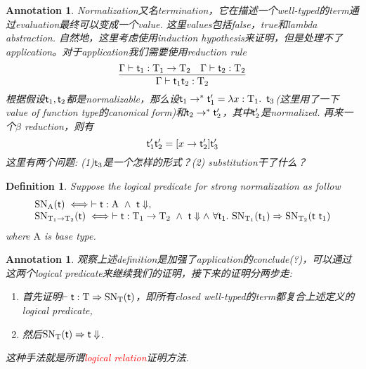 \documentclass{article}
\theoremstyle{plain}
\newtheorem{definition}[theorem]{Definition}
\newtheorem{annotation}[theorem]{Annotation}
\theoremstyle{nonumberplain}
\newcommand{\lam}[2]{\ensuremath{\lambda #1\ldotp~ #2}} %
\newcommand{\singletype}[1]{\text{#1}}
\newcommand{\termtype}[2]{\ensuremath{#1:#2}}
\newcommand{\term}[1]{\ensuremath\mathsf{#1}}
\newcommand{\redt}[1]{\textcolor{red}{#1}}
\begin{document}
\begin{annotation}
\rm Normalization又名termination，它在描述一个well-typed的term通过evaluation最终可以变成一个value. 这里values包括false，true和lambda abstraction. 自然地，这里考虑使用induction hypothesis来证明，但是处理不了application。对于application我们需要使用reduction rule
$$
\infer{\Gamma \vdash \termtype{\term{t}_1 \term{t}_2}{\singletype{T}_2}}{\Gamma	\vdash \termtype{\term{t}_1}{\singletype{T}_1 \to \singletype{T}_2 } & \Gamma \vdash \termtype{\term{t}_2}{\singletype{T}_2} }
$$
根据假设$\term{t}_1, \term{t}_2$都是normalizable，那么设$\term{t}_1 \to^* \term{t}_1' = \lam{\termtype{x}{\singletype{T}_1}}{\term{t}_3}$(这里用了一下value of function type的canonical form)和$\term{t}_2 \to^* \term{t}_2'$，其中$\term{t}_2'$是normalized. 再来一个$\beta$ reduction，则有
$$
\term{t}_1' \term{t}_2' = [x \to \term{t}_2']\term{t}_3'
$$
这里有两个问题: (1)$\term{t}_3$是一个怎样的形式？(2) substitution干了什么？  
\end{annotation}


\begin{definition}\label{logical predicate of SN}
\rm Suppose the logical predicate for strong normalization as follow
$$
\begin{array}{ll}
\text{SN}_{\singletype{A}}(\term{t}) \iff \vdash \termtype{\term{t}}{\singletype{A}} ~\wedge~ \term{t}\Downarrow,\\
\text{SN}_{\singletype{T}_1 \to \singletype{T}_2}(\term{t}) \iff \vdash \termtype{\term{t}}{\singletype{T}_1 \to \singletype{T}_2} ~\wedge~ \term{t}\Downarrow \wedge ~\forall \term{t_1}.~\text{SN}_{\singletype{T}_1}(\term{t}_1) \Rightarrow \text{SN}_{\singletype{T}_2}(\term{t}~\term{t}_1)
\end{array} 
$$
where $\singletype{A}$ is base type. 
\end{definition}

\begin{annotation}
\rm 观察上述definition是加强了application的conclude(?)，可以通过这两个logical predicate来继续我们的证明，接下来的证明分两步走:
\begin{enumerate}
	\item 首先证明$\vdash \termtype{\term{t}}{\singletype{T}} \Rightarrow \text{SN}_\singletype{T}(\term{t})$，即所有closed well-typed的term都复合上述定义的logical predicate,
	\item 然后$\text{SN}_\singletype{T}(\term{t}) \Rightarrow \term{t}\Downarrow$.
\end{enumerate}
这种手法就是所谓\redt{logical relation}证明方法. 
\end{annotation}
\end{document}
